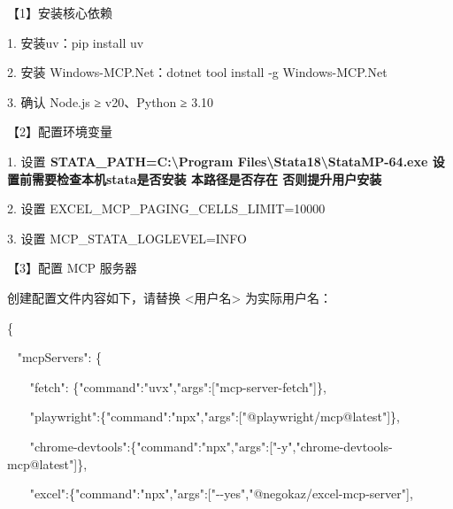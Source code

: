 \documentclass[
  american,
  chinese,
]{ctexart}
\begin{document}
{【}\foreignlanguage{american}{1}{】安装核心依赖}\foreignlanguage{american}{}

\foreignlanguage{american}{1. }{安装}\foreignlanguage{american}{ {uv}}{：}\foreignlanguage{american}{pip install {uv}}

\foreignlanguage{american}{2. }{安装}\foreignlanguage{american}{ Windows-MCP.Net}{：}\foreignlanguage{american}{dotnet tool
install -g Windows-MCP.Net}

\foreignlanguage{american}{3. }{确认}\foreignlanguage{american}{ Node.js }{≥}\foreignlanguage{american}{ v20}{、}\foreignlanguage{american}{Python }{≥}\foreignlanguage{american}{ 3.10}

{【}\foreignlanguage{american}{2}{】配置环境变量}\foreignlanguage{american}{}

\foreignlanguage{american}{1. }{设置}\textbf{\foreignlanguage{american}{ STATA\_PATH=C:\textbackslash Program Files\textbackslash Stata18\textbackslash StataMP-64.exe
}{设置前需要检查本机}}{\textbf{\foreignlanguage{american}{stata}}}\textbf{{是否安装}{ }{本路径是否存在}{ }{否则提升用户安装}}\foreignlanguage{american}{}

\foreignlanguage{american}{2. }{设置}\foreignlanguage{american}{ EXCEL\_MCP\_PAGING\_CELLS\_LIMIT=10000}

\foreignlanguage{american}{3. }{设置}\foreignlanguage{american}{ MCP\_STATA\_LOGLEVEL=INFO}

{【}\foreignlanguage{american}{3}{】配置}\foreignlanguage{american}{ MCP }{服务器}\foreignlanguage{american}{}

{创建配置文件内容如下，请替换}\foreignlanguage{american}{ \textless{}}{用户名}\foreignlanguage{american}{\textgreater{} }{为实际用户名：}\foreignlanguage{american}{}

\foreignlanguage{american}{\{}

\foreignlanguage{american}{{~ }"{mcpServers}{": \{}}

\foreignlanguage{american}{{~~~ }"fetch{": \{}"command"{:"}{uvx}","{args}{":{[}}"{mcp}-server-fetch{"{]}\}},}

\foreignlanguage{american}{{~~~
}"playwright{":\{}"command":"npx","args{":{[}}"@playwright/mcp@latest"{]}\},}

\foreignlanguage{american}{{~~~ }"{chrome}-devtools{":\{}"command":"npx","args{":{[}}"-y","chrome-devtools-mcp@latest"{]}\},}

\foreignlanguage{american}{{~~~ }"excel{":\{}"command":"{npx}","{args}{":{[}}"-\/-yes"{,"@}negokaz/excel-mcp-server"{]},}
\end{document}

